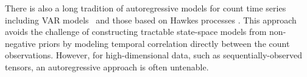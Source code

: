 \documentclass{article}
\begin{document}
There is also a long tradition of autoregressive models for count time series including VAR models~\cite{brandt2012bayesian} and those based on Hawkes processes \cite{hawkes1971spectra,blundell2012modelling,simma2012modeling,linderman2014discovering}. This approach avoids the challenge of constructing tractable state-space models from non-negative priors by modeling temporal correlation directly between the count observations. However, for high-dimensional data, such as sequentially-observed tensors, an autoregressive approach is often untenable.~ 










\end{document}

